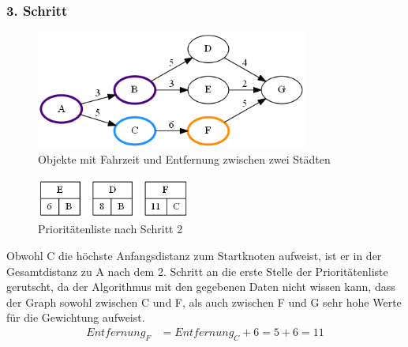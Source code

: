 \documentclass[11pt]{scrreprt}
\begin{document}
			\subsubsection{3. Schritt}
			\begin{figure}[ht]
				\centering
				\includegraphics[width=0.8\textwidth]{Graphs/Example3}
				\caption{Objekte mit Fahrzeit und Entfernung zwischen zwei Städten}
			\end{figure}
			\begin{figure}[ht]
				\centering
				\includegraphics[width=0.45\textwidth]{Graphs/Example3_PQ}
				\caption{Prioritätenliste nach Schritt 2}
			\end{figure}
			\FloatBarrier
			Obwohl C die höchste Anfangsdistanz zum Startknoten aufweist, ist er in der Gesamtdistanz zu A nach dem 2. Schritt an die erste Stelle der Prioritätenliste gerutscht, da der Algorithmus mit den gegebenen Daten nicht wissen kann, dass der Graph sowohl zwischen C und F, als auch zwischen F und G sehr hohe Werte für die Gewichtung aufweist.
			\begin{align*}
			Entfernung_F &= Entfernung_C + 6 = 5 + 6 = 11
			\end{align*}
			
			\newpage
\end{document}
